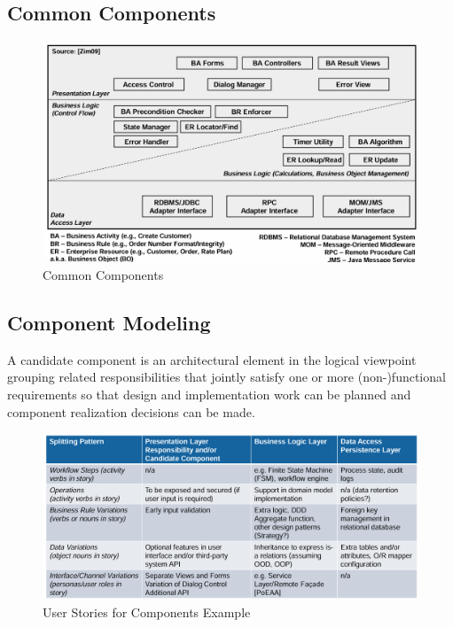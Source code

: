 \documentclass[../Main.tex]{subfiles}
\begin{document}
\subsection{Common Components}
\begin{figure}[H]
    \centering
    \includegraphics[angle=90,height=1.2\textwidth]{Images/commoncomponents.png}
    \caption{Common Components}
\end{figure}
\newpage

\subsection{Component Modeling}
A candidate component is an architectural element in the logical 
viewpoint grouping related responsibilities that jointly satisfy
one or more (non-)functional requirements so that design and
implementation work can be planned and component realization
decisions can be made.

\begin{figure}[H]
    \centering
    \includegraphics[width=1\linewidth]{Images/user-stories-components.png}
    \caption{User Stories for Components Example}
\end{figure}
\end{document}
